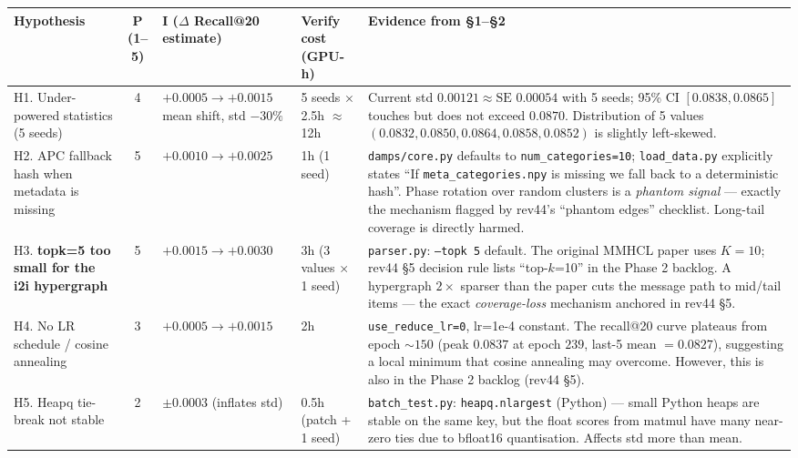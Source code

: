 \documentclass[11pt,a4paper]{article}
\begin{document}
\renewcommand{\arraystretch}{1.35}
\begin{longtable}{|p{3.6cm}|c|p{3.0cm}|p{2.4cm}|p{5.2cm}|}
\hline
\textbf{Hypothesis} & \textbf{P (1--5)} & \textbf{I ($\Delta$ Recall@20 estimate)} & \textbf{Verify cost (GPU-h)} & \textbf{Evidence from \S1--\S2} \\ \hline
\endhead

H1. Under-powered statistics (5 seeds) & 4 & $+0.0005 \to +0.0015$ mean shift, std $-30\%$ & 5 seeds $\times$ 2.5h $\approx$ 12h &
Current std $0.00121 \approx \text{SE } 0.00054$ with 5 seeds; 95\% CI $[0.0838, 0.0865]$ touches but does not exceed $0.0870$. Distribution of 5 values $(0.0832, 0.0850, 0.0864, 0.0858, 0.0852)$ is slightly left-skewed. \\ \hline

H2. APC fallback hash when metadata is missing & 5 & $+0.0010 \to +0.0025$ & 1h (1 seed) &
\texttt{damps/core.py} defaults to \texttt{num\_categories=10}; \texttt{load\_data.py} explicitly states ``If \texttt{meta\_categories.npy} is missing we fall back to a deterministic hash''. Phase rotation over random clusters is a \emph{phantom signal} --- exactly the mechanism flagged by rev44's ``phantom edges'' checklist. Long-tail coverage is directly harmed. \\ \hline

H3. \textbf{topk=5 too small for the i2i hypergraph} & 5 & $+0.0015 \to +0.0030$ & 3h (3 values $\times$ 1 seed) &
\texttt{parser.py}: \texttt{--topk 5} default. The original MMHCL paper uses $K=10$; rev44 \S5 decision rule lists ``top-$k$=10'' in the Phase 2 backlog. A hypergraph $2\times$ sparser than the paper cuts the message path to mid/tail items --- the exact \emph{coverage-loss} mechanism anchored in rev44 \S5. \\ \hline

H4. No LR schedule / cosine annealing & 3 & $+0.0005 \to +0.0015$ & 2h &
\texttt{use\_reduce\_lr=0}, lr=1e-4 constant. The recall@20 curve plateaus from epoch $\sim 150$ (peak $0.0837$ at epoch $239$, last-5 mean $=0.0827$), suggesting a local minimum that cosine annealing may overcome. However, this is also in the Phase 2 backlog (rev44 \S5). \\ \hline

H5. Heapq tie-break not stable & 2 & $\pm 0.0003$ (inflates std) & 0.5h (patch + 1 seed) &
\texttt{batch\_test.py}: \texttt{heapq.nlargest} (Python) --- small Python heaps are stable on the same key, but the float scores from matmul have many near-zero ties due to bfloat16 quantisation. Affects std more than mean. \\ \hline


\end{longtable}
\end{document}
